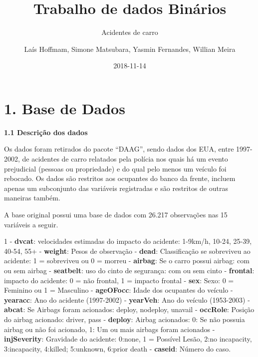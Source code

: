 \documentclass[]{article}
\title{Trabalho de dados Binários}
\subtitle{Acidentes de carro}
\author{Laís Hoffmam, Simone Matsubara, Yasmin Fernandes, Willian Meira}
\date{2018-11-14}
\begin{document}
\maketitle

\hypertarget{base-de-dados}{%
\section{1. Base de Dados}\label{base-de-dados}}

\textbf{1.1 Descrição dos dados}

Os dados foram retirados do pacote ``DAAG'', sendo dados dos EUA, entre
1997-2002, de acidentes de carro relatados pela polícia nos quais há um
evento prejudicial (pessoas ou propriedade) e do qual pelo menos um
veículo foi rebocado. Os dados são restritos aos ocupantes do banco da
frente, incluem apenas um subconjunto das variáveis registradas e são
restritos de outras maneiras também.

A base original possui uma base de dados com 26.217 observações nas 15
variáveis a seguir.

1 - \textbf{dvcat}: velocidades estimadas do impacto do acidente:
1-9km/h, 10-24, 25-39, 40-54, 55+  - \textbf{weight}: Pesos de
observação  - \textbf{dead}: Classificação se sobreviveu ao
acidente: 1 = sobreviveu ou 0 = morreu  - \textbf{airbag}: Se
o carro possui airbag: com ou sem airbag  - \textbf{seatbelt}:
uso do cinto de segurança: com ou sem cinto  -
\textbf{frontal}: impacto do acidente: 0 = não frontal, 1 = impacto
frontal  - \textbf{sex}: Sexo: 0 = Feminino ou 1 = Masculino
 - \textbf{ageOFocc}: Idade dos ocupantes do veículo
 - \textbf{yearacc}: Ano do acidente (1997-2002)  -
\textbf{yearVeh}: Ano do veículo (1953-2003)  -
\textbf{abcat}: Se Airbags foram acionados: deploy, nodeploy, unavail
 - \textbf{occRole}: Posição do airbag acionado: driver, pass
 - \textbf{deploy}: Airbag acionados: 0: Se não possuia
airbag ou não foi acionado, 1: Um ou mais airbags foram acionados
 - \textbf{injSeverity}: Gravidade do acidente: 0:none, 1 =
Possível Lesão, 2:no incapacity, 3:incapacity, 4:killed; 5:unknown,
6:prior death  - \textbf{caseid}: Número do caso.
\end{document}
